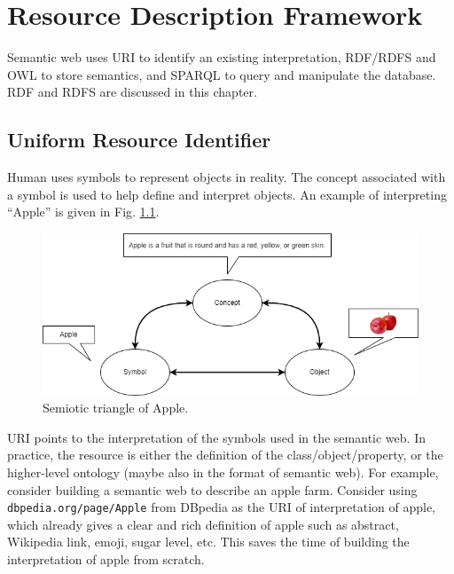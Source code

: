 \chapter{Resource Description Framework}

Semantic web uses URI to identify an existing interpretation, RDF/RDFS and OWL to store semantics, and SPARQL to query and manipulate the database. RDF and RDFS are discussed in this chapter.

\section{Uniform Resource Identifier}

Human uses symbols to represent objects in reality. The concept associated with a symbol is used to help define and interpret objects. An example of interpreting ``Apple'' is given in Fig. \ref{fig:semiotictriangle}.
\begin{figure}[htbp]
	\centering
	\includegraphics[width=\textwidth]{chapters/part-4/figures/semiotic_triangle.png}
	\caption{Semiotic triangle of Apple.}
	\label{fig:semiotictriangle}
\end{figure}

URI points to the interpretation of the symbols used in the semantic web. In practice, the resource is either the definition of the class/object/property, or the higher-level ontology (maybe also in the format of semantic web). For example, consider building a semantic web to describe an apple farm. Consider using \texttt{dbpedia.org/page/Apple} from DBpedia as the URI of interpretation of apple, which already gives a clear and rich definition of apple such as abstract, Wikipedia link, emoji, sugar level, etc. This saves the time of building the interpretation of apple from scratch.


